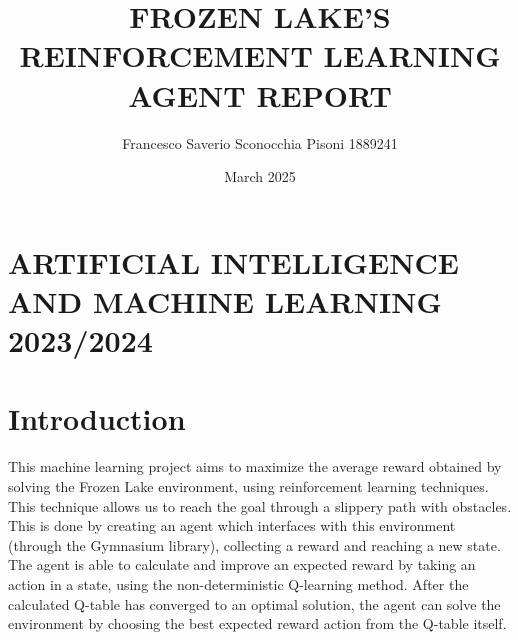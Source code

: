 \documentclass{article}
\title{\Huge FROZEN LAKE'S REINFORCEMENT LEARNING AGENT REPORT}
\author{Francesco Saverio Sconocchia Pisoni 1889241}
\date{March 2025}
\begin{document}
\titleformat{\paragraph}[block]{\normalfont\normalsize\bfseries}{\theparagraph}{1em}{}

\maketitle

\begin{center}
    \centering
\end{center}

\section*{\centering ARTIFICIAL INTELLIGENCE AND MACHINE LEARNING 2023/2024}
\clearpage

\tableofcontents

\clearpage


\section{Introduction}

This machine learning project aims to maximize the average reward obtained by solving the Frozen Lake environment, using reinforcement learning techniques.
This technique allows us to reach the goal through a slippery path with obstacles.
This is done by creating an agent which interfaces with this environment (through the Gymnasium library), collecting a reward and reaching a new state.
The agent is able to calculate and improve an expected reward by taking an action in a state, using the non-deterministic Q-learning method.
After the calculated Q-table has converged to an optimal solution, the agent can solve the environment by choosing the best expected reward action from the Q-table itself.
\end{document}
